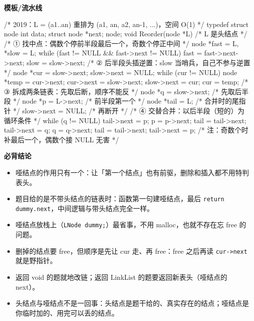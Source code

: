 \documentclass[10pt,a4paper]{ctexart}
\begin{document}
\textbf{模板/流水线}

\begin{codebox}
/* 2019：L = (a1..an) 重排为 (a1, an, a2, an-1, ...)，空间 O(1) */
typedef struct node {
    int data;
    struct node *next;
} node;
void Reorder(node *L) {                    /* L 是头结点 */
    /* ① 找中点：偶数个停前半段最后一个，奇数个停正中间 */
    node *fast = L, *slow = L;
    while (fast != NULL && fast->next != NULL) {
        fast = fast->next->next;
        slow = slow->next;
    }
    /* ② 后半段头插逆置：slow 当哨兵，自己不参与逆置 */
    node *cur = slow->next;
    slow->next = NULL;
    while (cur != NULL) {
        node *temp = cur->next;
        cur->next = slow->next;
        slow->next = cur;
        cur = temp;
    }
    /* ③ 拆成两条链表：先取后断，顺序不能反 */
    node *q = slow->next;                  /* 先取后半段 */
    node *p = L->next;                     /* 前半段第一个 */
    node *tail = L;                        /* 合并时的尾指针 */
    slow->next = NULL;                     /* 再断开 */
    /* ④ 交替合并：以后半段（短的）为循环条件 */
    while (q != NULL) {
        tail->next = p;  p = p->next;  tail = tail->next;
        tail->next = q;  q = q->next;  tail = tail->next;
    }
    tail->next = p;                        /* 注：奇数个时补最后一个，偶数个接 NULL 无害 */
}
\end{codebox}





\textbf{必背结论}

\begin{itemize}

\item 哑结点的作用只有一个：让「第一个结点」也有前驱，删除和插入都不用特判表头。

\item 题目给的是不带头结点的链表时：函数第一句建哑结点，最后 \texttt{return dummy.next}，中间逻辑与带头结点完全一样。

\item 哑结点放栈上（\texttt{LNode dummy;}）最省事，不用 malloc，也就不存在忘 free 的问题。

\item 删掉的结点要 free，但顺序是先让 cur 走、再 free：free 之后再读 \texttt{cur->next} 就是野指针。

\item 返回 void 的题就地改链；返回 LinkList 的题要返回新表头（哑结点的 next）。

\item 头结点与哑结点不是一回事：头结点是题干给的、真实存在的结点；哑结点是你临时加的、用完可以丢的结点。

\end{itemize}
\end{document}
